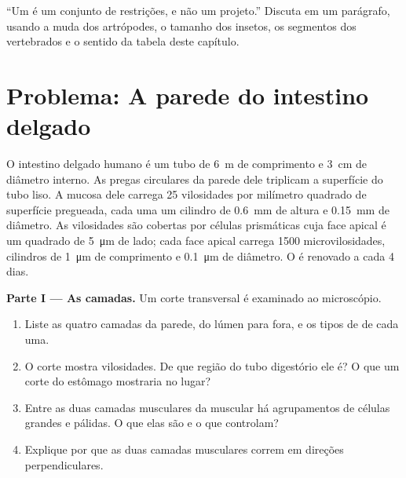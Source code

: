\begin{exercise}[$\star\star\star$]\label{exo:b1:body-plans-tissues:12}
``Um  é um conjunto de restrições, e não um
projeto.'' Discuta em um parágrafo, usando a muda dos artrópodes, o
tamanho dos insetos, os segmentos dos vertebrados e o sentido da tabela
deste capítulo.
\end{exercise}

\section{Problema: A parede do intestino delgado}

\begin{problem}
\label{pb:b1:body-plans-tissues:1}
O intestino delgado humano é um tubo de \qty{6}{m} de comprimento e
\qty{3}{cm} de diâmetro interno. As pregas circulares da parede dele
triplicam a superfície do tubo liso. A mucosa dele carrega \qty{25}{}
vilosidades por milímetro quadrado de superfície pregueada, cada uma um
cilindro de \qty{0.6}{mm} de altura e \qty{0.15}{mm} de diâmetro. As
vilosidades são cobertas por células prismáticas cuja face apical é um
quadrado de \qty{5}{\micro m} de lado; cada face apical carrega
\qty{1500}{} microvilosidades, cilindros de \qty{1}{\micro m} de
comprimento e \qty{0.1}{\micro m} de diâmetro. O  é renovado a
cada \qty{4}{} dias.

\medskip
\noindent\textbf{Parte I --- As camadas.}
Um corte transversal é examinado ao microscópio.
\begin{enumerate}
  \item Liste as quatro camadas da parede, do lúmen para fora, e os
        tipos de  de cada uma.
  \item O corte mostra vilosidades. De que região do tubo digestório ele
        é? O que um corte do estômago mostraria no lugar?
  \item Entre as duas camadas musculares da muscular há agrupamentos de
        células grandes e pálidas. O que elas são e o que controlam?
  \item Explique por que as duas camadas musculares correm em direções
        perpendiculares.
\end{enumerate}


\end{problem}
